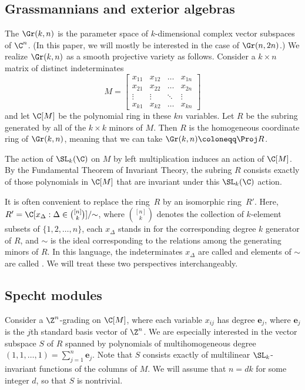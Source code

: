 \subsection{Grassmannians and exterior algebras}\label{sec:Grassmann}
The  $\Gr(k,n)$ is the parameter space of $k$-dimensional complex vector subspaces of $\C^n$. (In this paper, we will mostly be interested in the case of $\Gr(n,2n)$.) We realize $\Gr(k,n)$ as a smooth projective variety as follows. Consider a $k \times n$ matrix of distinct indeterminates 
\[
M = \begin{bmatrix}
    x_{11} & x_{12} & \dots & x_{1n}  \\
    x_{21} & x_{22} & \dots & x_{2n} \\
    \vdots & \vdots & \ddots & \vdots \\
    x_{k1} & x_{k2} & \dots & x_{kn}
\end{bmatrix}
\]
and let $\C[M]$ be the polynomial ring in these $kn$ variables. Let $R$ be the subring generated by all of the $k \times k$ minors of $M$. Then $R$ is the homogeneous coordinate ring of $\Gr(k,n)$, meaning that we can take $\Gr(k,n) \coloneqq \Proj R$. 

The action of $\SL_k(\C)$ on $M$ by left multiplication induces an action of $\C[M]$. By the Fundamental Theorem of Invariant Theory, the subring $R$ consists exactly of those polynomials in $\C[M]$ that are invariant under this $\SL_k(\C)$ action.

It is often convenient to replace the ring~$R$ by an isomorphic ring~$R'$. Here, $R' = \C[x_{\Delta} : \Delta \in \binom{[n]}{k}] / {\sim}$, where $\binom{[n]}{k}$ denotes the collection of $k$-element subsets of $\{1, 2, \dots, n\}$, each $x_\Delta$ stands in for the corresponding degree $k$ generator of $R$, and ${\sim}$ is the ideal corresponding to the relations among the generating minors of $R$. In this language, the indeterminates $x_\Delta$ are called  and elements of ${\sim}$ are called . We will treat these two perspectives interchangeably. 

\subsection{Specht modules}
\label{sec:Spechtbackground}

Consider a $\Z^n$-grading on $\C[M]$, where each variable $x_{ij}$ has degree $\mathbf{e}_j$, where $\mathbf{e}_j$ is the $j$th standard basis vector of $\Z^n$. We are especially interested in the vector subspace $S$ of $R$ spanned by polynomials of multihomogeneous degree $(1,1, \dots, 1) = \sum_{j = 1}^n \mathbf{e}_j$. Note that $S$ consists exactly of multilinear $\SL_k$-invariant functions of the columns of $M$. We will assume that $n = dk$ for some integer $d$, so that $S$ is nontrivial.

